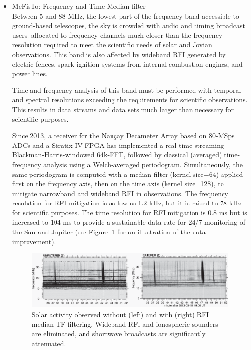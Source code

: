 \begin{itemize}
\item MeFisTo: Frequency and Time Median filter\\

Between 5 and 88 MHz, the lowest part of the frequency band accessible to ground-based telescopes, the sky is crowded with audio and timing broadcast users, allocated to frequency channels much closer than the frequency resolution required to meet the scientific needs of solar and Jovian observations. This band is also affected by wideband RFI generated by electric fences, spark ignition systems from internal combustion engines, and power lines.

Time and frequency analysis of this band must be performed with temporal and spectral resolutions exceeding the requirements for scientific observations. This results in data streams and data sets much larger than necessary for scientific purposes.

Since 2013, a receiver for the Nançay Decameter Array \citep{lecacheux2013, 2017pre8.conf..455L} based on 80-MSps ADCs and a Stratix IV FPGA has implemented a real-time streaming Blackman-Harris-windowed 64k-FFT, followed by classical (averaged) time-frequency analysis using a Welch-averaged periodogram. Simultaneously, the same periodogram is computed with a median filter (kernel size=64) applied first on the frequency axis, then on the time axis (kernel size=128), to mitigate narrowband and wideband RFI in observations. The frequency resolution for RFI mitigation is as low as 1.2 kHz, but it is raised to 78 kHz for scientific purposes. The time resolution for RFI mitigation is 0.8 ms but is increased to 104 ms to provide a sustainable data rate for 24/7 monitoring of the Sun and Jupiter (see Figure~\ref{fig:rfi_MeFisTo} for an illustration of the data improvement).

\begin{figure}[ht]
    \centering
    \includegraphics[width=\textwidth]{figures/MeFisTo.png}
    \caption{Solar activity observed without (left) and with (right) RFI median TF-filtering.  Wideband RFI and ionospheric sounders are eliminated, and shortwave broadcasts are significantly attenuated. \citep{lecacheux2013}}
    \label{fig:rfi_MeFisTo}
\end{figure}



\end{itemize}
